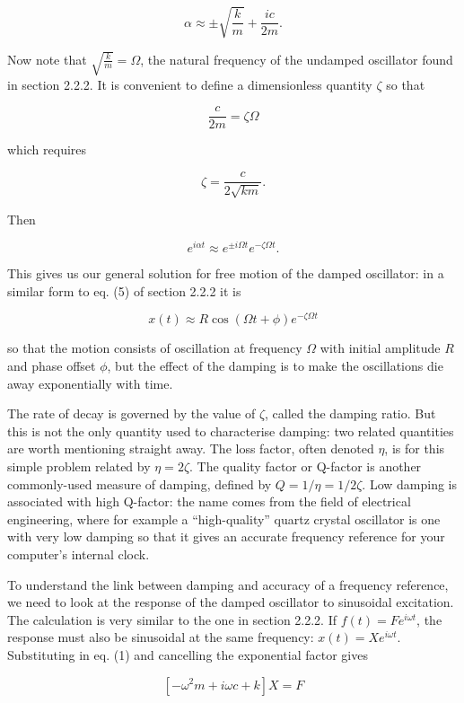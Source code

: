   $$\alpha \approx \pm \sqrt{\frac{k}{m}} + \frac{ic}{2m}. \tag{4} $$ 

  Now note that $\sqrt{\frac{k}{m}}=\Omega$, the natural frequency of the 
  undamped oscillator found in section 2.2.2. It is convenient to define a 
  dimensionless quantity $\zeta$ so that 

  $$\frac{c}{2m} = \zeta \Omega \tag{5} $$ 

  which requires 

  $$\zeta=\frac{c}{2\sqrt{km}}. \tag{6} $$ 

  Then 

  $$e^{i \alpha t} \approx e^{\pm i \Omega t} e^{-\zeta \Omega t}. \tag{7} $$ 

  This gives us our general solution for free motion of the damped oscillator: 
  in a similar form to eq. (5) of section 2.2.2 it is 

  $$x(t) \approx R \cos(\Omega t + \phi) e^{-\zeta \Omega t} \tag{8} $$ 

  so that the motion consists of oscillation at frequency $\Omega$ with initial 
  amplitude $R$ and phase offset $\phi$, but the effect of the damping is to 
  make the oscillations die away exponentially with time. 

  The rate of decay is governed by the value of $\zeta$, called the damping 
  ratio. But this is not the only quantity used to characterise damping: two 
  related quantities are worth mentioning straight away. The loss factor, often 
  denoted $\eta$, is for this simple problem related by $\eta=2\zeta$. The 
  quality factor or Q-factor is another commonly-used measure of damping, 
  defined by $Q=1/\eta=1/2\zeta$. Low damping is associated with high Q-factor: 
  the name comes from the field of electrical engineering, where for example a 
  ``high-quality'' quartz crystal oscillator is one with very low damping so 
  that it gives an accurate frequency reference for your computer's internal 
  clock. 

  To understand the link between damping and accuracy of a frequency reference, 
  we need to look at the response of the damped oscillator to sinusoidal 
  excitation. The calculation is very similar to the one in section 2.2.2. If 
  $f(t)=F e^{i \omega t}$, the response must also be sinusoidal at the same 
  frequency: $x(t) = Xe^{i \omega t}$. Substituting in eq. (1) and cancelling 
  the exponential factor gives 

  $$[-\omega^2 m + i \omega c +k]X=F \tag{9}$$ 

